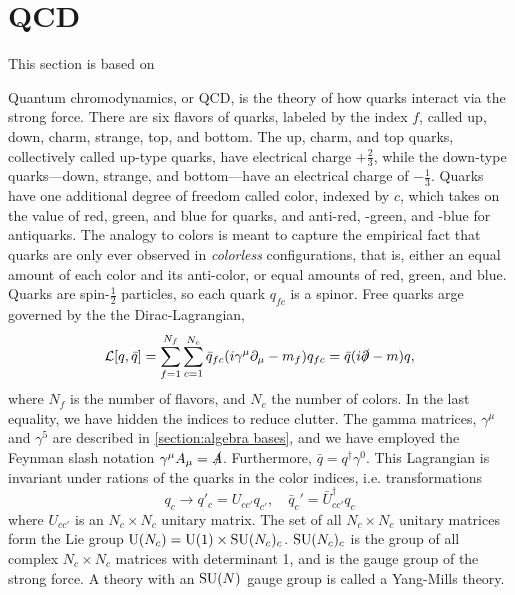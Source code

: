 \section{QCD}
\label{section:QCD}
This section is based on~\cite{Schwartz:QFT,Peskin:IntroQFT,Scherer2002IntroductionTC}

Quantum chromodynamics, or QCD, is the theory of how quarks interact via the strong force.
There are six flavors of quarks, labeled by the index $f$, called up, down, charm, strange, top, and bottom.
The up, charm, and top quarks, collectively called up-type quarks, have electrical charge $+\frac{2}{3}$, while the down-type quarks---down, strange, and bottom---have an electrical charge of $-\frac{1}{3}$.
Quarks have one additional degree of freedom called color, indexed by $c$, which takes on the value of red, green, and blue for quarks, and anti-red, -green, and -blue for antiquarks.
The analogy to colors is meant to capture the empirical fact that quarks are only ever observed in \emph{colorless} configurations, that is, either an equal amount of each color and its anti-color, or equal amounts of red, green, and blue.
Quarks are spin-$\frac{1}{2}$ particles, so each quark $q_{fc}$ is a spinor.
Free quarks arge governed by the the Dirac-Lagrangian,
\begin{equation}
    \mathcal{L}[q, \bar q] = \sum_{f=1}^{N_f} \sum_{c = 1}^{N_c} \bar q_{fc} (i\gamma^\mu \partial_\mu - m_f )q_{fc}
    = \bar q (i\slashed{\partial } - m)q,
\end{equation}
where $N_f$ is the number of flavors, and $N_c$ the number of colors.
In the last equality, we have hidden the indices to reduce clutter.
The gamma matrices, $\gamma^\mu$ and $\gamma^5$ are described in \autoref{section:algebra bases}, and we have employed the Feynman slash notation $\gamma^\mu A_\mu = \slashed A$.
Furthermore, $\bar q = q^\dagger \gamma^0$.
This Lagrangian is invariant under rations of the quarks in the color indices, i.e. transformations
\begin{equation}
    q_c \rightarrow q'_c = U_{cc'} q_{c'},
    \quad 
    \bar q_c' = \bar U_{cc'}^\dagger q_c
\end{equation}
where $U_{cc'}$ is an $N_c \times N_c$ unitary matrix.
The set of all $N_c\times N_c$ unitary matrices form the Lie group $\mathrm{U}(N_c) = \mathrm{U}(1)\times \mathrm{SU}(N_c)_c$.
$\mathrm{SU}(N_c)_c$ is the group of all complex $N_c\times N_c$ matrices with determinant 1, and is the gauge group of the strong force.
A theory with an $\mathrm{SU}(N)$ gauge group is called a Yang-Mills theory.


